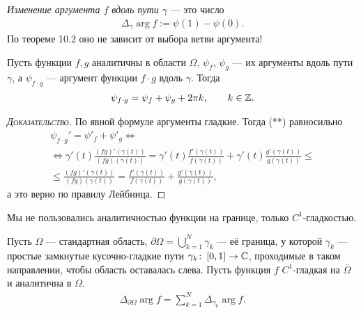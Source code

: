 \documentclass[../../main.tex]{subfiles}
\begin{document}
\begin{df}
 \textit{Изменение аргумента $ f $ вдоль пути $ \gamma $}  --- это число
 \begin{align*}
  \Delta_\gamma \arg f := \psi(1) - \psi(0).
 \end{align*} По теореме 10.2 оно не зависит от выбора ветви аргумента!
\end{df}
\begin{remrk}
 Пусть функции $ f,g $ аналитичны в области $ \Omega  $, $ \psi_f $, $ \psi_g $ --- их аргументы вдоль пути $ \gamma $, а $ \psi_{f\cdot g} $ --- аргумент функции $ f \cdot g $ вдоль $ \gamma $. Тогда
 \begin{align*}
  \psi_{f\cdot g} = \psi_f + \psi_g + 2\pi k, \qquad k \in \mathbb{Z}.
 \end{align*}
\end{remrk}
\begin{proof}[\normalfont\textsc{Доказательство}]
 По явной формуле аргументы гладкие. Тогда (**) равносильно
 \begin{align*}
  \psi_{f \cdot g}'  = \psi'_f + \psi'_g \iff \\
  \iff \gamma'(t) \frac{(fg)'(\gamma(t))}{(fg)(\gamma(t))} = \gamma'(t) \frac{f'(\gamma(t))}{f(\gamma(t))} +  \gamma'(t)\frac{g'(\gamma(t))}{g(\gamma(t))} \leqslant \\
  \leqslant \frac{(fg)'(\gamma(t))}{(fg)(\gamma(t))} = \frac{f'(\gamma(t))}{f(\gamma(t))} + \frac{g'(\gamma(t))}{g(\gamma(t))},
 \end{align*} а это верно по правилу Лейбница.
\end{proof}

\begin{remrk*}
 Мы не пользовались аналитичностью функции на границе, только $ C^{1} $-гладкостью.
\end{remrk*}

\begin{df}
 Пусть $ \Omega $ --- стандартная область, $ \partial \Omega  = \bigcup_{k=1}^{N} \gamma_k $  --- её граница, у которой $ \gamma_k $ --- простые замкнутые кусочно-гладкие пути  $ \gamma_k \colon\, [0,1] \to \mathbb{C} $, проходимые в таком направлении, чтобы область оставалась слева. Пусть функция $ f $ $ C^{1} $-гладкая на $ \overline \Omega $ и аналитична в $ \Omega $.
 \begin{align*}
  \Delta_{\partial \Omega} \arg f = \sum_{k=1}^{N}\Delta_{\gamma_k} \arg f.
 \end{align*}
\end{df}
\end{document}
